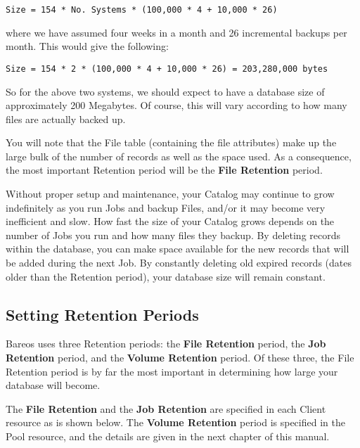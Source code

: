 \footnotesize
\begin{verbatim}
Size = 154 * No. Systems * (100,000 * 4 + 10,000 * 26)
\end{verbatim}
\normalsize

where we have assumed four weeks in a month and 26 incremental backups per month.
This would give the following:

\footnotesize
\begin{verbatim}
Size = 154 * 2 * (100,000 * 4 + 10,000 * 26) = 203,280,000 bytes
\end{verbatim}
\normalsize

So for the above two systems, we should expect to have a database size of
approximately 200 Megabytes. Of course, this will vary according to how many
files are actually backed up.

You will note that the File table (containing the file attributes) make up
the large bulk of the number of records as well as the space used.
As a consequence, the most important Retention
period will be the {\bf File Retention} period.


Without proper setup and maintenance, your Catalog may continue to grow
indefinitely as you run Jobs and backup Files, and/or it may become
very inefficient and slow. How fast the size of your
Catalog grows depends on the number of Jobs you run and how many files they
backup. By deleting records within the database, you can make space available
for the new records that will be added during the next Job. By constantly
deleting old expired records (dates older than the Retention period), your
database size will remain constant.


\subsection{Setting Retention Periods}
\label{Retention}

Bareos uses three Retention periods: the {\bf File Retention} period,
the {\bf Job Retention} period, and the {\bf Volume Retention} period. Of
these three, the File Retention period is by far the most important in
determining how large your database will become.

The {\bf File Retention} and the {\bf Job Retention} are specified in each
Client resource as is shown below. The {\bf Volume Retention} period is
specified in the Pool resource, and the details are given in the next chapter
of this manual.

